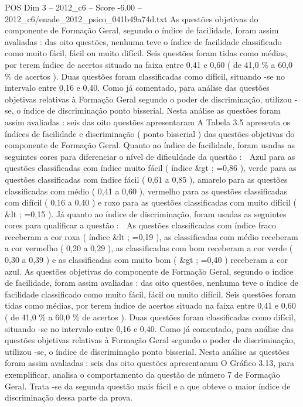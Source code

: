 \begin{textsample}{POS Dim 3 – 2012\_c6 – Score -6.00 – 2012\_c6/enade\_2012\_psico\_041b49a74d.txt}
As questões objetivas do componente de Formação Geral, segundo o índice de facilidade, foram assim avaliadas : das oito questões, nenhuma teve o índice de facilidade classificado como muito fácil, fácil ou muito difícil.
Seis questões foram tidas como médias, por terem índice de acertos situado na faixa entre 0,41 e 0,60 ( de 41,0 \% a 60,0 \% de acertos ).
Duas questões foram classificadas como difícil, situando -se no intervalo entre 0,16 e 0,40.
Como já comentado, para análise das questões objetivas relativas à Formação Geral segundo o poder de discriminação, utilizou -se, o índice de discriminação ponto bisserial.
Nesta análise as questões foram assim avaliadas : seis das oito questões apresentaram A Tabela 3.5 apresenta os índices de facilidade e discriminação ( ponto bisserial ) das questões objetivas do componente de Formação Geral.
Quanto ao índice de facilidade, foram usadas as seguintes cores para diferenciar o nível de dificuldade da questão :  Azul para as questões classificadas com índice muito fácil ( índice \&gt ; =0,86 ), verde para as questões classificadas com índice fácil ( 0,61 a 0,85 ), amarelo para as questões classificadas com médio ( 0,41 a 0,60 ), vermelho para as questões classificadas com difícil ( 0,16 a 0,40 ) e roxo para as questões classificadas com muito difícil ( \&lt ; =0,15 ).
Já quanto ao índice de discriminação, foram usadas as seguintes cores para qualificar a questão :  As questões classificadas com índice fraco receberam a cor roxa ( índice \&lt ; =0,19 ), as classificadas com médio receberam a cor vermelho ( 0,20 a 0,29 ), as classificadas com bom receberam a cor verde ( 0,30 a 0,39 ) e as classificadas com muito bom ( \&gt ; =0,40 ) receberam a cor azul.
As questões objetivas do componente de Formação Geral, segundo o índice de facilidade, foram assim avaliadas : das oito questões, nenhuma teve o índice de facilidade classificado como muito fácil, fácil ou muito difícil.
Seis questões foram tidas como médias, por terem índice de acertos situado na faixa entre 0,41 e 0,60 ( de 41,0 \% a 60,0 \% de acertos ).
Duas questões foram classificadas como difícil, situando -se no intervalo entre 0,16 e 0,40.
Como já comentado, para análise das questões objetivas relativas à Formação Geral segundo o poder de discriminação, utilizou -se, o índice de discriminação ponto bisserial.
Nesta análise as questões foram assim avaliadas : seis das oito questões apresentaram O Gráfico 3.13, para exemplificar, analisa o comportamento da questão de número 7 de Formação Geral.
Trata -se da segunda questão mais fácil e a que obteve o maior índice de discriminação dessa parte da prova.

\end{textsample}
